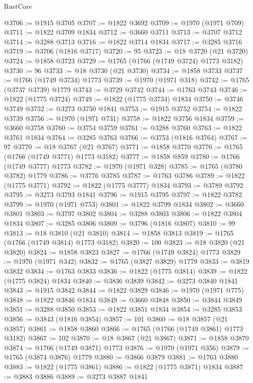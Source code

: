 \begin{lexlean}{RustCore}
\begin{coremodule}
@3706 := @1915 @3705
@3707 := @1822 @3692
@3709 := @1970 (@1971 @709)
@3711 := @1822 @3709 @1834
@3712 := @3660 @3711
@3713 := @3707 @3712
@3714 := @3288 @3713
@3716 := @1822 @3714 @1834
@3717 := @3285 @3716
@3719 := @3706 (@1816 @3717)
@3720 := 95
@3723 := @18 @3720 (@21 @3720)
@3724 := @1858 @3723
@3729 := @1765 (@1766 (@1749 @3724) @1773 @3182)
@3730 := 96
@3733 := @18 @3730 (@21 @3730)
@3734 := @1858 @3733
@3737 := @1766 (@1749 @3734) @1773
@3739 := @1970 (@1971 @318)
@3742 := @1765 (@3737 @3739) @1779
@3743 := @3729 @3742
@3744 := @1763 @3743
@3746 := @1822 (@1775 @3724)
@3749 := @1822 (@1775 @3734) @1834
@3750 := @3746 @3749
@3752 := @3273 @3750 @1841
@3753 := @1915 @3752
@3754 := @1822 @3739
@3756 := @1970 (@1971 @731)
@3758 := @1822 @3756 @1834
@3759 := @3660 @3758
@3760 := @3754 @3759
@3761 := @3288 @3760
@3763 := @1822 @3761 @1834
@3764 := @3285 @3763
@3766 := @3753 (@1816 @3764)
@3767 := 97
@3770 := @18 @3767 (@21 @3767)
@3771 := @1858 @3770
@3776 := @1765 (@1766 (@1749 @3771) @1773 @3182)
@3777 := @1858 @859
@3780 := @1766 (@1749 @3777) @1773
@3782 := @1970 (@1971 @328)
@3785 := @1765 (@3780 @3782) @1779
@3786 := @3776 @3785
@3787 := @1763 @3786
@3789 := @1822 (@1775 @3771)
@3792 := @1822 (@1775 @3777) @1834
@3793 := @3789 @3792
@3795 := @3273 @3793 @1841
@3796 := @1915 @3795
@3797 := @1822 @3782
@3799 := @1970 (@1971 @753)
@3801 := @1822 @3799 @1834
@3802 := @3660 @3801
@3803 := @3797 @3802
@3804 := @3288 @3803
@3806 := @1822 @3804 @1834
@3807 := @3285 @3806
@3809 := @3796 (@1816 @3807)
@3810 := 99
@3813 := @18 @3810 (@21 @3810)
@3814 := @1858 @3813
@3819 := @1765 (@1766 (@1749 @3814) @1773 @3182)
@3820 := 100
@3823 := @18 @3820 (@21 @3820)
@3824 := @1858 @3823
@3827 := @1766 (@1749 @3824) @1773
@3829 := @1970 (@1971 @342)
@3832 := @1765 (@3827 @3829) @1779
@3833 := @3819 @3832
@3834 := @1763 @3833
@3836 := @1822 (@1775 @3814)
@3839 := @1822 (@1775 @3824) @1834
@3840 := @3836 @3839
@3842 := @3273 @3840 @1841
@3843 := @1915 @3842
@3844 := @1822 @3829
@3846 := @1970 (@1971 @775)
@3848 := @1822 @3846 @1834
@3849 := @3660 @3848
@3850 := @3844 @3849
@3851 := @3288 @3850
@3853 := @1822 @3851 @1834
@3854 := @3285 @3853
@3856 := @3843 (@1816 @3854)
@3857 := 101
@3860 := @18 @3857 (@21 @3857)
@3861 := @1858 @3860
@3866 := @1765 (@1766 (@1749 @3861) @1773 @3182)
@3867 := 102
@3870 := @18 @3867 (@21 @3867)
@3871 := @1858 @3870
@3874 := @1766 (@1749 @3871) @1773
@3876 := @1970 (@1971 @356)
@3879 := @1765 (@3874 @3876) @1779
@3880 := @3866 @3879
@3881 := @1763 @3880
@3883 := @1822 (@1775 @3861)
@3886 := @1822 (@1775 @3871) @1834
@3887 := @3883 @3886
@3889 := @3273 @3887 @1841

\end{coremodule}
\end{lexlean}
